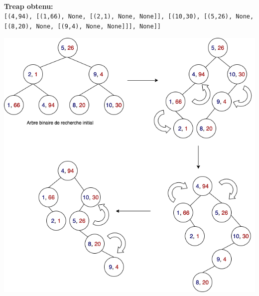 \begin{Exercice}[30 minutes]
\begin{solution}
    \textbf{\\Treap obtenu:} \\
    \lstinline{[(4,94), [(1,66), None, [(2,1), None, None]], [(10,30), [(5,26), None, [(8,20), None, [(9,4), None, None]]], None]]}

    \begin{center}
        \includegraphics[width=\linewidth]{solutions/treap.png}
    \end{center}    
    \end{solution}
\end{Exercice}



